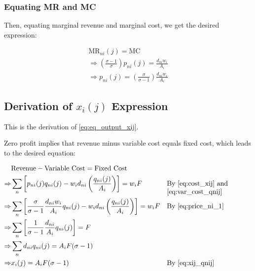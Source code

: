\documentclass[10pt]{article}
\begin{document}
\subsubsection{Equating MR and MC}

Then, equating marginal revenue and marginal cost, we get
the desired expression:

\begin{align}
    \text{MR}_{n i}(j) = \text{MC} \\
    \Rightarrow \left(\frac{\sigma - 1}{\sigma}\right) p_{n i}(j) = \frac{d_{ni} w_i}{A_i} \\
    \Rightarrow p_{n i}(j) = \left(\frac{\sigma}{\sigma-1}\right) \frac{d_{ni} w_i}{A_i}
\end{align}

\subsection{Derivation of $x_i(j)$ Expression}
\label{sec:eq_output_xij}

This is the derivation of \eqref{eq:eq_output_xij}.

Zero profit implies that 
revenue minus variable cost equals fixed cost,
which leads to the desired equation:

\begin{align}
    &\text{Revenue} - \text{Variable Cost} = \text{Fixed Cost} \\
    \Rightarrow & \sum_n \left[p_{ni}(j) q_{ni}(j) - w_i d_{ni} \left(\frac{q_{ni}(j)}{A_i}\right)\right] = w_i F && \parbox[t]{4cm}{\raggedright By \eqref{eq:cost_xij} and \eqref{eq:var_cost_qnij}} \\
    \Rightarrow & \sum_n \left[\frac{\sigma}{\sigma-1} \frac{d_{ni} w_i}{A_i} q_{ni}(j) - w_i d_{ni} \left(\frac{q_{ni}(j)}{A_i}\right)\right] = w_i F && \parbox[t]{4cm}{\raggedright By \eqref{eq:price_ni_1}} \\
    \Rightarrow & \sum_n \left[\frac{1}{\sigma-1} \frac{d_{ni}}{A_i} q_{ni}(j)\right] = F \\ 
    \Rightarrow & \sum_n d_{ni} q_{ni}(j) = A_i F (\sigma-1) \\
    \Rightarrow & x_i(j) = A_i F (\sigma-1) && \parbox[t]{4cm}{\raggedright By \eqref{eq:xij_qnij}}
\end{align}

\end{document}
